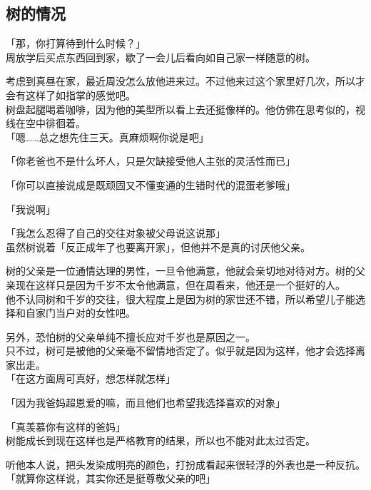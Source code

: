 \subsection{树的情况}

「那，你打算待到什么时候？」\\

周放学后买点东西回到家，歇了一会儿后看向如自己家一样随意的树。

考虑到真昼在家，最近周没怎么放他进来过。不过他来过这个家里好几次，所以才会有这样了如指掌的感觉吧。\\

树盘起腿喝着咖啡，因为他的美型所以看上去还挺像样的。他仿佛在思考似的，视线在空中徘徊着。\\

「嗯……总之想先住三天。真麻烦啊你说是吧」

「你老爸也不是什么坏人，只是欠缺接受他人主张的灵活性而已」

「你可以直接说成是既顽固又不懂变通的生错时代的混蛋老爹哦」

「我说啊」

「我怎么忍得了自己的交往对象被父母说这说那」\\

虽然树说着「反正成年了也要离开家」，但他并不是真的讨厌他父亲。

树的父亲是一位通情达理的男性，一旦令他满意，他就会亲切地对待对方。树的父亲现在这样只是因为千岁不太令他满意，但在周看来，他还是一个挺好的人。\\

他不认同树和千岁的交往，很大程度上是因为树的家世还不错，所以希望儿子能选择和自家门当户对的女性吧。

另外，恐怕树的父亲单纯不擅长应对千岁也是原因之一。\\

只不过，树可是被他的父亲毫不留情地否定了。似乎就是因为这样，他才会选择离家出走。\\

「在这方面周可真好，想怎样就怎样」

「因为我爸妈超恩爱的嘛，而且他们也希望我选择喜欢的对象」

「真羡慕你有这样的爸妈」\\

树能成长到现在这样也是严格教育的结果，所以也不能对此太过否定。

听他本人说，把头发染成明亮的颜色，打扮成看起来很轻浮的外表也是一种反抗。\\

「就算你这样说，其实你还是挺尊敬父亲的吧」

